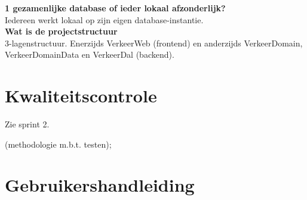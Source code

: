 \documentclass[a4paper]{article}
\begin{document}
\textbf{1 gezamenlijke database of ieder lokaal afzonderlijk?}\\
Iedereen werkt lokaal op zijn eigen database-instantie.\\

\textbf{Wat is de projectstructuur}\\
3-lagenstructuur. Enerzijds VerkeerWeb (frontend) en anderzijds VerkeerDomain, VerkeerDomainData en VerkeerDal (backend).\\

\newpage
\section{Kwaliteitscontrole}
\label{sec:kwaliteitscontrole}

Zie sprint 2.

(methodologie m.b.t. testen);



\section{Gebruikershandleiding}
\label{sec:gebruikershandleiding}

\end{document}
